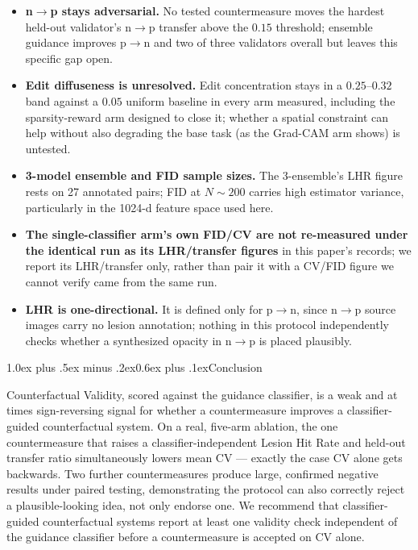 \documentclass[10pt,twocolumn]{article}
\makeatletter
\renewcommand\section{\@startsection{section}{1}{\z@}%
  {1.0ex plus .5ex minus .2ex}{0.6ex plus .1ex}{\normalfont\large\bfseries}}
\makeatother
\begin{document}
\begin{itemize}[leftmargin=*,itemsep=1pt,topsep=2pt]
  \item \textbf{n$\to$p stays adversarial.} No tested countermeasure moves
        the hardest held-out validator's n$\to$p transfer above the
        $0.15$ threshold; ensemble guidance improves p$\to$n and two of
        three validators overall but leaves this specific gap open.
  \item \textbf{Edit diffuseness is unresolved.} Edit concentration stays
        in a $0.25$--$0.32$ band against a $0.05$ uniform baseline in
        every arm measured, including the sparsity-reward arm designed to
        close it; whether a spatial constraint can help without also
        degrading the base task (as the Grad-CAM arm shows) is untested.
  \item \textbf{3-model ensemble and FID sample sizes.} The 3-ensemble's
        LHR figure rests on 27 annotated pairs; FID at $N\!\sim\!200$
        carries high estimator variance, particularly in the 1024-d
        feature space used here.
  \item \textbf{The single-classifier arm's own FID/CV are not
        re-measured under the identical run as its LHR/transfer figures}
        in this paper's records; we report its LHR/transfer only, rather
        than pair it with a CV/FID figure we cannot verify came from the
        same run.
  \item \textbf{LHR is one-directional.} It is defined only for p$\to$n,
        since n$\to$p source images carry no lesion annotation; nothing
        in this protocol independently checks whether a synthesized
        opacity in n$\to$p is placed plausibly.
\end{itemize}

\section{Conclusion}

Counterfactual Validity, scored against the guidance classifier, is a
weak and at times sign-reversing signal for whether a countermeasure
improves a classifier-guided counterfactual system. On a real, five-arm
ablation, the one countermeasure that raises a classifier-independent
Lesion Hit Rate and held-out transfer ratio simultaneously lowers mean CV
— exactly the case CV alone gets backwards. Two further countermeasures
produce large, confirmed negative results under paired testing,
demonstrating the protocol can also correctly reject a plausible-looking
idea, not only endorse one. We recommend that classifier-guided
counterfactual systems report at least one validity check independent of
the guidance classifier before a countermeasure is accepted on CV alone.
\end{document}
